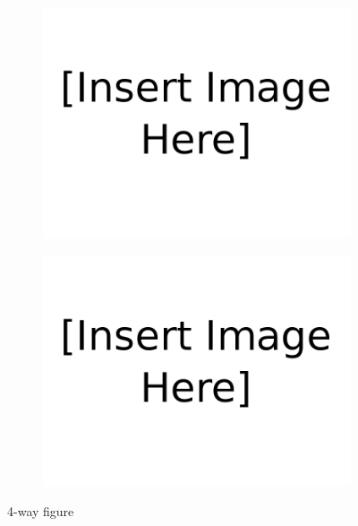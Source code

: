 \begin{figure}[H]
\begin{subfigure}[b]{0.48\textwidth}
            \centering 
            \includegraphics[width=\textwidth]{figures/Insert_image_here.png}
            \caption{}    
            \label{fig:3}
        \end{subfigure}
        \hfill
        \begin{subfigure}[b]{0.48\textwidth}   
            \centering 
            \includegraphics[width=\textwidth]{figures/Insert_image_here.png}
            \caption{}   
            \label{fig:4}
        \end{subfigure}
        \caption{4-way figure} 
        \label{fig:4-way figure}
\end{figure}


